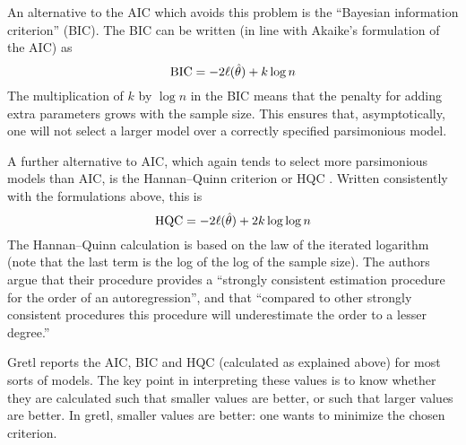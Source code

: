 An alternative to the AIC which avoids this problem is the
\cite{schwarz78} ``Bayesian information criterion'' (BIC).  The BIC
can be written (in line with Akaike's formulation of the AIC) as
%
\[
{\rm BIC} = -2 \ell(\hat{\theta}) + k \log n
\]
The multiplication of $k$ by $\log n$ in the BIC means that the
penalty for adding extra parameters grows with the sample size.  This
ensures that, asymptotically, one will not select a larger model over
a correctly specified parsimonious model.

A further alternative to AIC, which again tends to select more
parsimonious models than AIC, is the Hannan--Quinn criterion or HQC
\citep{hannan-quinn79}.  Written consistently with the formulations
above, this is
%
\[
{\rm HQC} = -2 \ell(\hat{\theta}) + 2k \log \log n
\]
%
The Hannan--Quinn calculation is based on the law of the iterated
logarithm (note that the last term is the log of the log of the sample
size).  The authors argue that their procedure provides a ``strongly
consistent estimation procedure for the order of an autoregression'',
and that ``compared to other strongly consistent procedures this
procedure will underestimate the order to a lesser degree.''

\vspace{1ex}

Gretl reports the AIC, BIC and HQC (calculated as explained above) for
most sorts of models.  The key point in interpreting these values is
to know whether they are calculated such that smaller values are
better, or such that larger values are better.  In gretl, smaller
values are better: one wants to minimize the chosen criterion.





